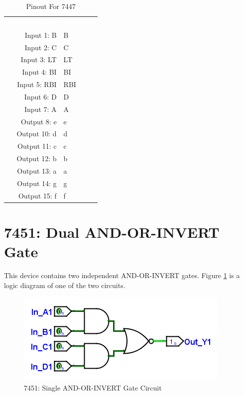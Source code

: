 \begin{table}[H]
	\sffamily
	\newcommand{\head}[1]{\textcolor{white}{\textbf{#1}}}		
	\begin{center}
		\begin{tabular}{rl} 
			\rowcolor{black!75}
			\head{Logisim Label} & \head{Function} \\
			Input 1: B   & B   \\
			Input 2: C   & C   \\
			Input 3: LT  & LT  \\
			Input 4: BI  & BI  \\
			Input 5: RBI & RBI \\
			Input 6: D   & D   \\
			Input 7: A   & A   \\
			Output 8: e  & e   \\
			Output 10: d & d   \\
			Output 11: c & c   \\
			Output 12: b & b   \\
			Output 13: a & a   \\
			Output 14: g & g   \\
			Output 15: f & f   \\
		\end{tabular}
	\end{center}
	\caption{Pinout For 7447}
	\label{tab:50-7447a}
\end{table}

\section{7451: Dual AND-OR-INVERT Gate}

This device contains two independent AND-OR-INVERT gates. Figure \ref{fig:50-7451} is a logic diagram of one of the two circuits.

\begin{figure}[H]
	\centering
	\includegraphics{gfx/50-7451}
	\caption{7451: Single AND-OR-INVERT Gate Circuit}
	\label{fig:50-7451}
\end{figure}

